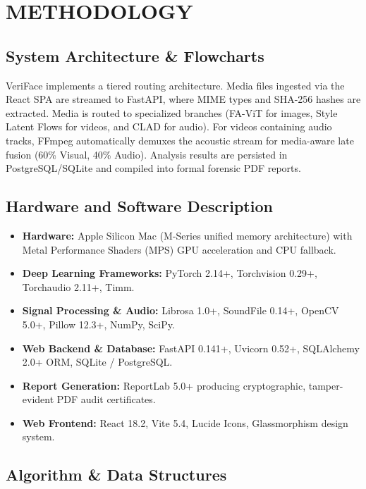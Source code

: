 \documentclass[12pt,a4paper]{report}
\begin{document}
\chapter{METHODOLOGY}

\section{System Architecture \& Flowcharts}
VeriFace implements a tiered routing architecture. Media files ingested via the React SPA are streamed to FastAPI, where MIME types and SHA-256 hashes are extracted. Media is routed to specialized branches (FA-ViT for images, Style Latent Flows for videos, and CLAD for audio). For videos containing audio tracks, FFmpeg automatically demuxes the acoustic stream for media-aware late fusion (60\% Visual, 40\% Audio). Analysis results are persisted in PostgreSQL/SQLite and compiled into formal forensic PDF reports.

\section{Hardware and Software Description}
\begin{itemize}[leftmargin=*]
    \item \textbf{Hardware:} Apple Silicon Mac (M-Series unified memory architecture) with Metal Performance Shaders (MPS) GPU acceleration and CPU fallback.
    \item \textbf{Deep Learning Frameworks:} PyTorch 2.14+, Torchvision 0.29+, Torchaudio 2.11+, Timm.
    \item \textbf{Signal Processing \& Audio:} Librosa 1.0+, SoundFile 0.14+, OpenCV 5.0+, Pillow 12.3+, NumPy, SciPy.
    \item \textbf{Web Backend \& Database:} FastAPI 0.141+, Uvicorn 0.52+, SQLAlchemy 2.0+ ORM, SQLite / PostgreSQL.
    \item \textbf{Report Generation:} ReportLab 5.0+ producing cryptographic, tamper-evident PDF audit certificates.
    \item \textbf{Web Frontend:} React 18.2, Vite 5.4, Lucide Icons, Glassmorphism design system.
\end{itemize}

\section{Algorithm \& Data Structures}
\end{document}

